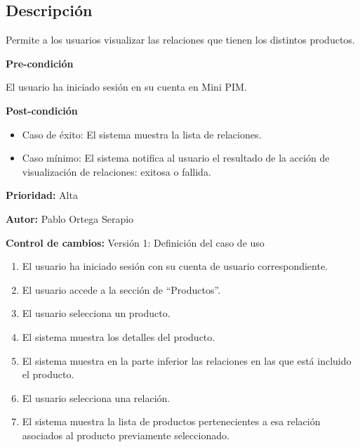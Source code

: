 
\subsection*{Descripción}
Permite a los usuarios visualizar las relaciones que tienen los distintos productos.\par
\vspace{0.15cm}

\textbf{Pre-condición}\par
El usuario ha iniciado sesión en su cuenta en Mini PIM.\par
\vspace{0.15cm}

\textbf{Post-condición}
\begin{itemize}
    \item Caso de éxito: El sistema muestra la lista de relaciones.
    \item Caso mínimo: El sistema notifica al usuario el resultado de la acción de visualización de relaciones: exitosa o fallida.
\end{itemize}

\textbf{Prioridad: }
Alta
\vspace{0.15cm}

\textbf{Autor: }
Pablo Ortega Serapio\par
\vspace{0.15cm}

\textbf{Control de cambios: } Versión 1: Definición del caso de uso

\begin{enumerate}
    \item El usuario ha iniciado sesión con su cuenta de usuario correspondiente.
    \item El usuario accede a la sección de \enquote{Productos}.
    \item El usuario selecciona un producto.
    \item El sistema muestra los detalles del producto.
    \item El sistema muestra en la parte inferior las relaciones en las que está incluido el producto.
    \item El usuario selecciona una relación.
    \item El sistema muestra la lista de productos pertenecientes a esa relación asociados al producto previamente seleccionado.
\end{enumerate}

